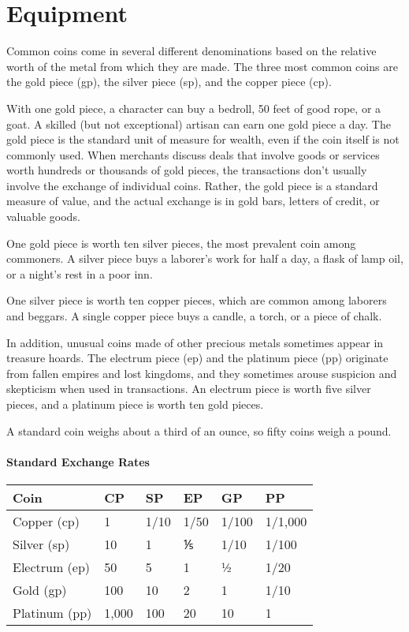 \documentclass[
]{article}
\date{}
\begin{document}
\hypertarget{equipment}{%
\section{Equipment}\label{equipment}}

Common coins come in several different denominations based on the
relative worth of the metal from which they are made. The three most
common coins are the gold piece (gp), the silver piece (sp), and the
copper piece (cp).

With one gold piece, a character can buy a bedroll, 50 feet of good
rope, or a goat. A skilled (but not exceptional) artisan can earn one
gold piece a day. The gold piece is the standard unit of measure for
wealth, even if the coin itself is not commonly used. When merchants
discuss deals that involve goods or services worth hundreds or thousands
of gold pieces, the transactions don't usually involve the exchange of
individual coins. Rather, the gold piece is a standard measure of value,
and the actual exchange is in gold bars, letters of credit, or valuable
goods.

One gold piece is worth ten silver pieces, the most prevalent coin among
commoners. A silver piece buys a laborer's work for half a day, a flask
of lamp oil, or a night's rest in a poor inn.

One silver piece is worth ten copper pieces, which are common among
laborers and beggars. A single copper piece buys a candle, a torch, or a
piece of chalk.

In addition, unusual coins made of other precious metals sometimes
appear in treasure hoards. The electrum piece (ep) and the platinum
piece (pp) originate from fallen empires and lost kingdoms, and they
sometimes arouse suspicion and skepticism when used in transactions. An
electrum piece is worth five silver pieces, and a platinum piece is
worth ten gold pieces.

A standard coin weighs about a third of an ounce, so fifty coins weigh a
pound.

\hypertarget{standard-exchange-rates}{%
\paragraph{Standard Exchange Rates}\label{standard-exchange-rates}}

\begin{longtable}[]{@{}llllll@{}}
\toprule
Coin & CP & SP & EP & GP & PP\tabularnewline
\midrule
\endhead
Copper (cp) & 1 & 1/10 & 1/50 & 1/100 & 1/1,000\tabularnewline
Silver (sp) & 10 & 1 & ⅕ & 1/10 & 1/100\tabularnewline
Electrum (ep) & 50 & 5 & 1 & ½ & 1/20\tabularnewline
Gold (gp) & 100 & 10 & 2 & 1 & 1/10\tabularnewline
Platinum (pp) & 1,000 & 100 & 20 & 10 & 1\tabularnewline
\bottomrule
\end{longtable}
\end{document}
